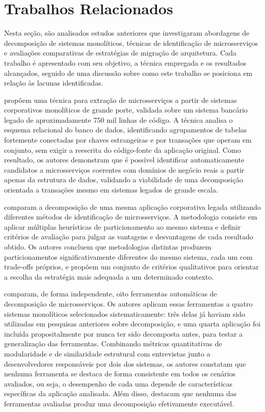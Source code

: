 \chapter{Trabalhos Relacionados}


Nesta seção, são analisados estudos anteriores que investigaram abordagens de decomposição de sistemas monolíticos, técnicas de identificação de microsserviços e avaliações comparativas de estratégias de migração de arquitetura. Cada trabalho é apresentado com seu objetivo, a técnica empregada e os resultados alcançados, seguido de uma discussão sobre como este trabalho se posiciona em relação às lacunas identificadas. 

\textcite{levcovitz2016} propõem uma técnica para extração de microsserviços a partir de sistemas corporativos monolíticos de grande porte, validada sobre um sistema bancário legado de aproximadamente 750 mil linhas de código. A técnica analisa o esquema relacional do banco de dados, identificando agrupamentos de tabelas fortemente conectadas por chaves estrangeiras e por transações que operam em conjunto, sem exigir a reescrita do código-fonte da aplicação original. Como resultado, os autores demonstram que é possível identificar automaticamente candidatos a microsserviços coerentes com domínios de negócio reais a partir apenas da estrutura de dados, validando a viabilidade de uma decomposição orientada a transações mesmo em sistemas legados de grande escala.

\textcite{kazanavicius2020} comparam a decomposição de uma mesma aplicação corporativa legada utilizando diferentes métodos de identificação de microsserviços. A metodologia consiste em aplicar múltiplas heurísticas de particionamento ao mesmo sistema e definir critérios de avaliação para julgar as vantagens e desvantagens de cada resultado obtido. Os autores concluem que metodologias distintas produzem particionamentos significativamente diferentes do mesmo sistema, cada um com trade-offs próprios, e propõem um conjunto de critérios qualitativos para orientar a escolha da estratégia mais adequada a um determinado contexto.

\textcite{wang2024} comparam, de forma independente, oito ferramentas automáticas de decomposição de microsserviços. Os autores aplicam essas ferramentas a quatro sistemas monolíticos selecionados sistematicamente: três delas já haviam sido utilizadas em pesquisas anteriores sobre decomposição, e uma quarta aplicação foi incluída propositalmente por nunca ter sido decomposta antes, para testar a generalização das ferramentas. Combinando métricas quantitativas de modularidade e de similaridade estrutural com entrevistas junto a desenvolvedores responsáveis por dois dos sistemas, os autores constatam que nenhuma ferramenta se destaca de forma consistente em todos os cenários avaliados, ou seja, o desempenho de cada uma depende de características específicas da aplicação analisada. Além disso, destacam que nenhuma das ferramentas avaliadas produz uma decomposição efetivamente executável.

